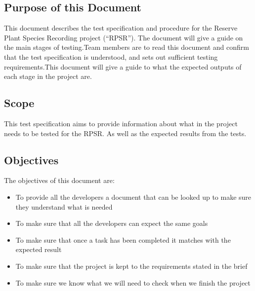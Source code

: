 \subsection{Purpose of this Document}
	This document describes the test specification and procedure for the Reserve Plant Species Recording project (“RPSR”).	The document will give a guide on the main stages of testing.Team members are to read this document and confirm that the test specification is understood, and sets out sufficient testing requirements.This document will give a guide to what the expected outputs of each stage in the project are.
	
\subsection{Scope}
	This test specification aims to provide  information about what in the project needs to be tested for the RPSR. As well as the expected results from the tests.
	
	
\subsection{Objectives}
	The objectives of this document are:
	\begin{itemize}
		\item To provide all the developers a document that can be looked up to make sure they understand what is needed
		\item To make sure that all the developers can expect the same goals
		\item To make sure that once a task has been completed it matches with the expected result
		\item To make sure that the project is kept to the requirements stated in the brief
		\item To make sure we know what we will need to check when we finish the project
	\end{itemize}